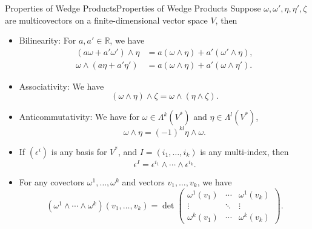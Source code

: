 \documentclass[../main.tex]{subfiles}
\begin{document}
\begin{proposition}{Properties of Wedge Products}{Properties of Wedge Products}
  Suppose $\omega, \omega', \eta, \eta', \zeta$ are multicovectors on a finite-dimensional vector space $V$, then
  \begin{itemize}
    \item Bilinearity: For $a,a'\in \mathbb{R}$, we have
      \begin{equation*}
        \begin{aligned}
          (a\omega + a'\omega') \wedge \eta &= a(\omega \wedge \eta) + a'(\omega' \wedge \eta), \\
          \omega \wedge (a\eta + a'\eta') &= a(\omega \wedge \eta) + a'(\omega \wedge \eta').
        \end{aligned}
      \end{equation*}
    \item Associativity: We have
      \begin{equation*}
        (\omega \wedge \eta) \wedge \zeta = \omega \wedge (\eta \wedge \zeta).
      \end{equation*}
    \item Anticommutativity: We have for $\omega \in \Lambda^k(V^*)$ and $\eta \in \Lambda^l(V^*)$,
      \begin{equation*}
        \omega \wedge \eta = (-1)^{kl} \eta \wedge \omega.
      \end{equation*}
    \item If $(\epsilon^i)$ is any basis for $V^*$, and $I = (i_1, \dots, i_k)$ is any multi-index, then
      \begin{equation*}
        \epsilon^I = \epsilon^{i_1} \wedge \cdots \wedge \epsilon^{i_k}.
      \end{equation*}
    \item For any covectors $\omega^1, \ldots , \omega^k$ and vectors $v_1, \ldots , v_k$, we have
      \begin{equation*}
        (\omega^1 \wedge \cdots \wedge \omega^k)(v_1, \dots, v_k) = \det\begin{pmatrix}
          \omega^1(v_1) & \cdots & \omega^1(v_k) \\
          \vdots & \ddots & \vdots \\
          \omega^k(v_1) & \cdots & \omega^k(v_k)
        \end{pmatrix}.
      \end{equation*}
  \end{itemize}
\end{proposition}
\end{document}
